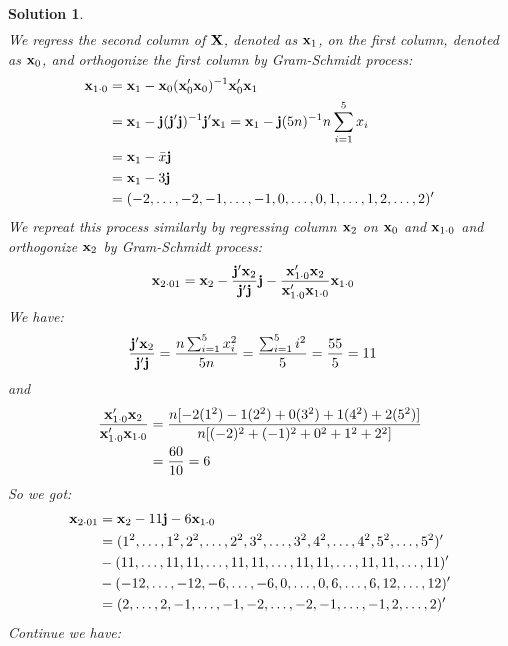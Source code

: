 \documentclass[11pt]{article}
\newtheorem{sol}{Solution}
\begin{document}
\begin{sol}
\begin{align*}
\end{align*}
We regress the second column of ${\bf X}$, denoted as ${\bf x}_1$, on the first column, denoted as ${\bf x}_0$, and orthogonize the first column by Gram-Schmidt process:
\begin{align*}
	{\bf x}_{1\cdot 0} &= {\bf x}_1 - {\bf x}_0({\bf x}'_0{\bf x}_0)^{-1}{\bf x}'_0{\bf x}_1\\
	&= {\bf x}_1 - {\bf j}({\bf j}'{\bf j})^{-1}{\bf j}'{\bf x}_1 ={\bf x}_1 - {\bf j}(5n)^{-1}n\sum_{i = 1}^{5}x_i\\
	&= {\bf x}_1 - \bar{x}{\bf j}\\
	&= {\bf x}_1 - 3{\bf j}\\
	&= (-2, \ldots, -2, -1, \ldots, -1, 0, \ldots, 0, 1, \ldots, 1, 2, \ldots, 2)'
\end{align*}
We repreat this process similarly by regressing column ${\bf x}_2$ on ${\bf x}_0$ and ${\bf x}_{1\cdot 0}$ and orthogonize ${\bf x}_2$ by Gram-Schmidt process:
\begin{align*}
	{\bf x}_{2\cdot 01} &= {\bf x}_2 - \frac{{\bf j}'{\bf x}_2}{{\bf j}'{\bf j}}{\bf j} - \frac{{\bf x}'_{1\cdot 0}{\bf x}_2}{{\bf x}'_{1\cdot 0}{\bf x}_{1\cdot 0}}{\bf x}_{1\cdot 0}
\end{align*}
We have:
\begin{align*}
	\frac{{\bf j}'{\bf x}_2}{{\bf j}'{\bf j}} &= \frac{n\sum_{i = 1}^5x_i^2}{5n} = \frac{\sum_{i = 1}^{5}i^2}{5} = \frac{55}{5} = 11
\end{align*}
and
\begin{align*}
	\frac{{\bf x}'_{1\cdot 0}{\bf x}_2}{{\bf x}'_{1\cdot 0}{\bf x}_{1\cdot 0}} &= \frac{n[-2(1^2) -1(2^2) + 0(3^2) + 1(4^2) + 2(5^2)]}{n[(-2)^2 + (-1)^2 + 0^2 + 1^2 + 2^2]}\\
	&= \frac{60}{10} = 6
\end{align*}
So we got:
\begin{align*}
	{\bf x}_{2\cdot 01} &= {\bf x}_2 - 11{\bf j} -6{\bf x}_{1\cdot 0}\\
	&= (1^2, \ldots, 1^2, 2^2, \ldots, 2^2, 3^2, \ldots, 3^2, 4^2, \ldots, 4^2, 5^2, \ldots, 5^2)'\\
	&- (11, \ldots, 11, 11, \ldots, 11, 11, \ldots, 11, 11, \ldots, 11, 11, \ldots, 11)'\\
	&- (-12, \ldots, -12, -6, \ldots, -6, 0, \ldots, 0, 6, \ldots, 6, 12, \ldots, 12)'\\
	&= (2, \ldots, 2, -1, \ldots, -1, -2, \ldots, -2, -1, \ldots, -1, 2, \ldots, 2)'
\end{align*}
Continue we have:
\begin{align*}

\end{align*}
\end{sol}
\end{document}
